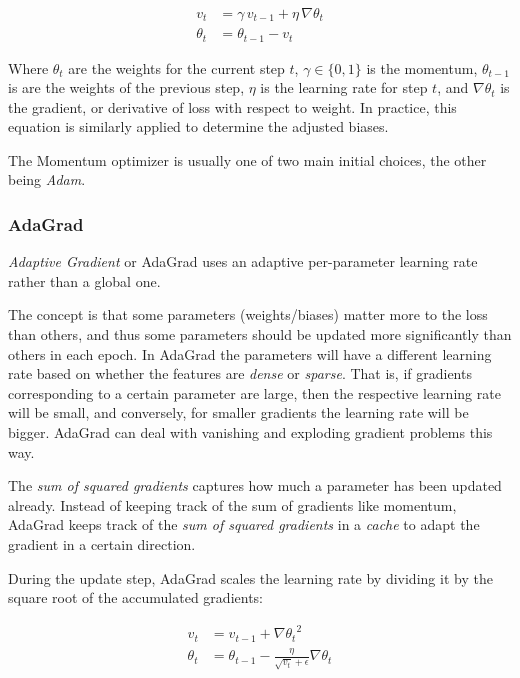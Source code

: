 \documentclass[a4paper]{article}
\begin{document}
\begin{align*}
    v_t &= \gamma \, v_{t-1} + \eta \, \nabla\theta_t \\
    \theta_t &= \theta_{t-1} - v_t
\end{align*}

Where $\theta_t$ are the weights for the current step $t$, $\gamma \in \{0,1\}$ is the momentum, $\theta_{t-1}$ is are the weights of the previous step, $\eta$ is the learning rate for step $t$, and $\nabla\theta_t$ is the gradient, or derivative of loss with respect to weight. In practice, this equation is similarly applied to determine the adjusted biases.

The Momentum optimizer is usually one of two main initial choices, the other being \emph{Adam}. 

\subsubsection*{AdaGrad}
\emph{Adaptive Gradient} or AdaGrad uses an adaptive per-parameter learning rate rather than a global one. 

The concept is that some parameters (weights/biases) matter more to the loss than others, and thus some parameters should be updated more significantly than others in each epoch. In AdaGrad the parameters will have a different learning rate based on whether the features are \emph{dense} or \emph{sparse}. That is, if gradients corresponding to a certain parameter are large, then the respective learning rate will be small, and conversely, for smaller gradients the learning rate will be bigger. AdaGrad can deal with vanishing and exploding gradient problems this way.

The \emph{sum of squared gradients} captures how much a parameter has been updated already. Instead of keeping track of the sum of gradients like momentum, AdaGrad keeps track of the \emph{sum of squared gradients} in a \emph{cache} to adapt the gradient in a certain direction.

During the update step, AdaGrad scales the learning rate by dividing it by the square root of the accumulated gradients:

\begin{align*}
    v_t &= v_{t-1} + {\nabla\theta_t}^2 \\
    \theta_t &= \theta_{t-1} - \frac{\eta}{\sqrt{v_t} + \epsilon} \nabla\theta_t
\end{align*}
\end{document}
